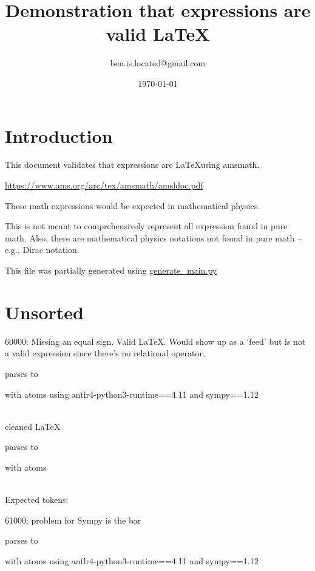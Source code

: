 \documentclass{article}
\title{Demonstration that expressions are valid \LaTeX}
\author{ben.is.located@gmail.com}
\date{\today}
\begin{document}
\maketitle

\section{Introduction}
This document validates that expressions are \LaTeX using amsmath. 

\href{https://www.ams.org/arc/tex/amsmath/amsldoc.pdf}{https://www.ams.org/arc/tex/amsmath/amsldoc.pdf}

These math expressions would be expected in mathematical physics.

This is not meant to comprehensively represent all expression found in pure math. Also, there are mathematical physics notations not found in pure math -- e.g., Dirac notation.

This file was partially generated using
\href{https://github.com/allofphysicsgraph/latex-example-expressions/blob/master/generate_main.py}{generate\_main.py}

\section{Unsorted}

60000: 
Missing an equal sign. Valid \LaTeX. Would show up as a `feed' but is not a valid expression since there's no relational operator.

parses to

with atoms
using antlr4-python3-runtime==4.11 and sympy==1.12

\ \\
cleaned \LaTeX

parses to

with atoms


\ \\
Expected tokens:



\hrulefill

61000:
problem for Sympy is the bar

parses to

with atoms
using antlr4-python3-runtime==4.11 and sympy==1.12
\end{document}
